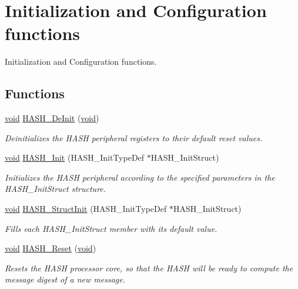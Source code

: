 \hypertarget{group___h_a_s_h___group1}{\section{Initialization and Configuration functions}
\label{group___h_a_s_h___group1}
}


Initialization and Configuration functions.  


\subsection*{Functions}
\begin{DoxyCompactItemize}
\item 
\hyperlink{group___n_a_m_e_ga18028b8badbf1ea7e704ccac3c488e82}{void} \hyperlink{group___h_a_s_h___group1_ga88717fe3a4f557182841a958e1dcd9c7}{H\-A\-S\-H\-\_\-\-De\-Init} (\hyperlink{group___n_a_m_e_ga18028b8badbf1ea7e704ccac3c488e82}{void})
\begin{DoxyCompactList}\small\item\em Deinitializes the H\-A\-S\-H peripheral registers to their default reset values. \end{DoxyCompactList}\item 
\hyperlink{group___n_a_m_e_ga18028b8badbf1ea7e704ccac3c488e82}{void} \hyperlink{group___h_a_s_h___group1_ga4a7d33f0954ac0463a6cda81121635cf}{H\-A\-S\-H\-\_\-\-Init} (H\-A\-S\-H\-\_\-\-Init\-Type\-Def $\ast$H\-A\-S\-H\-\_\-\-Init\-Struct)
\begin{DoxyCompactList}\small\item\em Initializes the H\-A\-S\-H peripheral according to the specified parameters in the H\-A\-S\-H\-\_\-\-Init\-Struct structure. \end{DoxyCompactList}\item 
\hyperlink{group___n_a_m_e_ga18028b8badbf1ea7e704ccac3c488e82}{void} \hyperlink{group___h_a_s_h___group1_ga9cfaaa73eafec40a06154f58d48adeb5}{H\-A\-S\-H\-\_\-\-Struct\-Init} (H\-A\-S\-H\-\_\-\-Init\-Type\-Def $\ast$H\-A\-S\-H\-\_\-\-Init\-Struct)
\begin{DoxyCompactList}\small\item\em Fills each H\-A\-S\-H\-\_\-\-Init\-Struct member with its default value. \end{DoxyCompactList}\item 
\hyperlink{group___n_a_m_e_ga18028b8badbf1ea7e704ccac3c488e82}{void} \hyperlink{group___h_a_s_h___group1_ga11745813cf85a08b2058aac3bd026e4d}{H\-A\-S\-H\-\_\-\-Reset} (\hyperlink{group___n_a_m_e_ga18028b8badbf1ea7e704ccac3c488e82}{void})
\begin{DoxyCompactList}\small\item\em Resets the H\-A\-S\-H processor core, so that the H\-A\-S\-H will be ready to compute the message digest of a new message. \end{DoxyCompactList}\end{DoxyCompactItemize}


